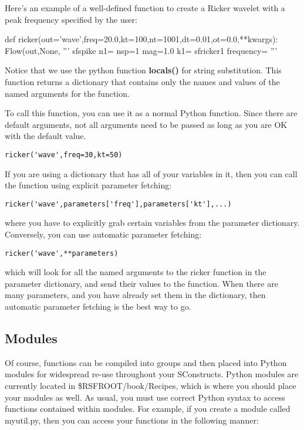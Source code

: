 Here's an example of a well-defined function to create a Ricker wavelet with a peak frequency specified by the user:

\begin{verbatimtab}[4]
def ricker(out='wave',freq=20.0,kt=100,nt=1001,dt=0.01,ot=0.0,**kwargs):
	Flow(out,None,
		'''
		sfspike n1=%
        nsp=1 mag=1.0 k1=%
		sfricker1 frequency=%
		''' %
\end{verbatimtab}

Notice that we use the python function \textbf{locals()} for string substitution.  This function returns a dictionary that contains only the names and values of the named arguments for the function.  

To call this function, you can use it as a normal Python function.  Since there are default arguments, not all arguments need to be passed as long as you are OK with the default value.  

\begin{verbatim}
ricker('wave',freq=30,kt=50)
\end{verbatim}

If you are using a dictionary that has all of your variables in it, then you can call the function using explicit parameter fetching:

\begin{verbatim}
ricker('wave',parameters['freq'],parameters['kt'],...)
\end{verbatim}

where you have to explicitly grab certain variables from the parameter dictionary.  Conversely, you can use automatic parameter fetching: 

\begin{verbatim}
ricker('wave',**parameters)
\end{verbatim}

which will look for all the named arguments to the ricker function in the parameter dictionary, and send their values to the function.  When there are many parameters, and you have already set them in the dictionary, then automatic parameter fetching is the best way to go.

\subsection{Modules}
Of course, functions can be compiled into groups and then placed into Python modules for widespread re-use throughout your SConstructs.  Python modules are currently located in \$RSFROOT/book/Recipes, which is where you should place your modules as well.  As usual, you must use correct Python syntax to access functions contained within modules.  For example, if you create a module called myutil.py, then you can access your functions in the following manner:

